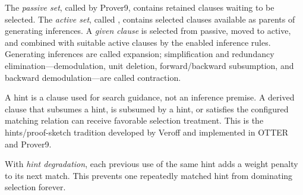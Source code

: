 \documentclass[11pt]{article}
\newcommand{\setting}[1]{\texttt{\detokenize{#1}}}
\begin{document}
The \emph{passive set}, called \setting{sos} by Prover9, contains retained
clauses waiting to be selected.  The \emph{active set}, called
\setting{usable}, contains selected clauses available as parents of generating
inferences.  A \emph{given clause} is selected from passive, moved to active,
and combined with suitable active clauses by the enabled inference rules.
Generating inferences are called expansion; simplification and redundancy
elimination---demodulation, unit deletion, forward/backward subsumption, and
backward demodulation---are called contraction.

A hint is a clause used for search guidance, not an inference premise.  A
derived clause that subsumes a hint, is subsumed by a hint, or satisfies the
configured matching relation can receive favorable selection treatment.  This
is the hints/proof-sketch tradition developed by Veroff and implemented in
OTTER and Prover9.

With \emph{hint degradation}, each previous use of the same hint adds a weight
penalty to its next match.  This prevents one repeatedly matched hint from
dominating selection forever.
\end{document}
